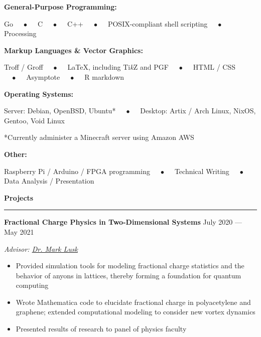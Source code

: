 \documentclass{article}
\begin{document}
\hspace{1.5em} \textbf{General-Purpose Programming:}

\hspace{3.0em} Go $\quad\bullet\quad$ C $\quad\bullet\quad$ C++ $\quad\bullet\quad$ POSIX-compliant shell scripting $\quad\bullet\quad$ Processing

\vspace{0.5em}

\hspace{1.5em} \textbf{Markup Languages \& Vector Graphics:}

\hspace{3.0em} Troff / Groff $\quad\bullet\quad$ {\LaTeX}, including Ti\textit{k}Z and PGF $\quad\bullet\quad$ HTML / CSS $\quad\bullet\quad$ Asymptote $\quad\bullet\quad$ R markdown

\vspace{0.5em}

\hspace{1.5em} \textbf{Operating Systems:}

\hspace{3.0em} Server: Debian, OpenBSD, Ubuntu* $\quad\bullet\quad$ Desktop: Artix / Arch Linux, NixOS, Gentoo, Void Linux

\hspace{4.5em} *Currently administer a Minecraft server using Amazon AWS

\vspace{0.5em}

\hspace{1.5em} \textbf{Other:}

\hspace{3.0em} Raspberry Pi / Arduino / FPGA programming $\quad\bullet\quad$ Technical Writing $\quad\bullet\quad$ Data Analysis / Presentation

\vspace{1em}

\textbf{\Large{Projects}} \\[-0.5em]
\rule{\textwidth}{1pt}

\hspace{1.5em} \textbf{Fractional Charge Physics in Two-Dimensional Systems} \hfill July 2020 --- May 2021

\hspace{1.5em} \textit{Advisor: \href{https://people.mines.edu/mlusk/}{Dr. Mark Lusk}}

\vspace{-0.5em}

\begin{itemize}[leftmargin=6.0em]
\setlength{\itemsep}{0em}
\item Provided simulation tools for modeling fractional charge statistics and the behavior of anyons in lattices, thereby forming a foundation for quantum computing
\item Wrote Mathematica code to elucidate fractional charge in polyacetylene and graphene; extended computational modeling to consider new vortex dynamics
\item Presented results of research to panel of physics faculty
\end{itemize}
\end{document}
